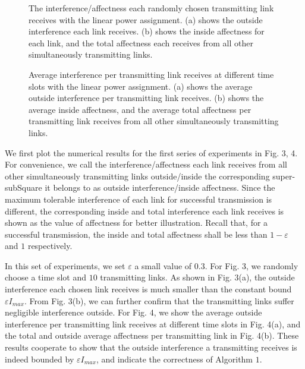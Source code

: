 \documentclass[journal]{IEEEtran}
\begin{document}
\begin{figure}[t]
    \centering
 \begin{minipage}{0.49\textwidth}
    \centering
    \hspace{0cm}
     \caption{{\small{The interference/affectness each randomly chosen transmitting link receives with the linear power assignment. (a) shows the outside interference each link receives. (b) shows the inside affectness for each link, and the total affectness each receives from all other simultaneously transmitting links.}}}
  \end{minipage}
  \hspace{0cm}
  \hfill
 \begin{minipage}{0.49\textwidth}
    \centering
  \hspace{0cm}
     \caption{{\small{Average interference per transmitting link receives at different time slots with the linear power assignment. (a) shows the average outside interference  per transmitting link receives. (b) shows the average inside affectness, and the average total affectness per transmitting link receives from all other simultaneously transmitting links.} }}
 \end{minipage}
\end{figure}
We first plot the numerical results for the first series of experiments in Fig. 3, 4. For convenience, we call the interference/affectness each link receives from all other simultaneously transmitting links outside/inside the corresponding super-subSquare it belongs to as outside interference/inside affectness. Since the maximum tolerable interference of each link for successful transmission is different, the corresponding inside and total interference each link receives is shown as the value of affectness for better illustration. Recall that, for a successful transmission, the inside and total affectness shall be less than $1-\varepsilon$ and $1$ respectively.

In this set of experiments, we set $\varepsilon$ a small value of $0.3$.  For Fig. 3, we randomly choose a time slot and $10$ transmitting links. As shown in Fig. 3(a), the outside interference each chosen link receives is much smaller than the constant bound $\varepsilon I_{max}$. From Fig. 3(b), we can further confirm that the transmitting links suffer negligible interference outside. For Fig. 4, we show the average outside interference per transmitting link receives at different time slots in Fig. 4(a), and the total and outside average affectness  per transmitting link in Fig. 4(b). These results cooperate to show that the outside interference a transmitting receives is indeed bounded by $\varepsilon I_{max}$, and indicate the correctness of Algorithm $1$.
\end{document}
